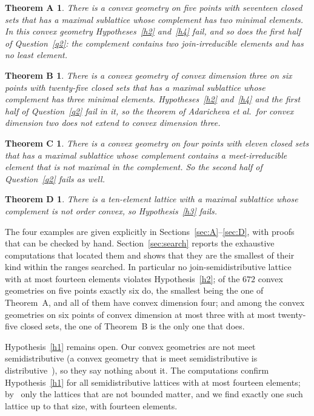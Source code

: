 \documentclass[11pt]{amsart}
\newtheorem*{theoremA}{Theorem A}
\newtheorem*{theoremB}{Theorem B}
\newtheorem*{theoremC}{Theorem C}
\newtheorem*{theoremD}{Theorem D}
\theoremstyle{definition}
\theoremstyle{remark}
\numberwithin{equation}{section}
\begin{document}
\begin{theoremA}
There is a convex geometry on five points with seventeen closed sets that has a maximal sublattice whose complement has two minimal elements. In this convex geometry Hypotheses~\ref{h2} and~\ref{h4} fail, and so does the first half of Question~\ref{q2}: the complement contains two join-irreducible elements and has no least element.
\end{theoremA}

\begin{theoremB}
There is a convex geometry of convex dimension three on six points with twenty-five closed sets that has a maximal sublattice whose complement has three minimal elements. Hypotheses~\ref{h2} and~\ref{h4} and the first half of Question~\ref{q2} fail in it, so the theorem of Adaricheva et al.\ for convex dimension two does not extend to convex dimension three.
\end{theoremB}

\begin{theoremC}
There is a convex geometry on four points with eleven closed sets that has a maximal sublattice whose complement contains a meet-irreducible element that is not maximal in the complement. So the second half of Question~\ref{q2} fails as well.
\end{theoremC}

\begin{theoremD}
There is a ten-element lattice with a maximal sublattice whose complement is not order convex, so Hypothesis~\ref{h3} fails.
\end{theoremD}

The four examples are given explicitly in Sections~\ref{sec:A}--\ref{sec:D}, with proofs that can be checked by hand. Section~\ref{sec:search} reports the exhaustive computations that located them and shows that they are the smallest of their kind within the ranges searched. In particular no join-semidistributive lattice with at most fourteen elements violates Hypothesis~\ref{h2}; of the $672$ convex geometries on five points exactly six do, the smallest being the one of Theorem~A, and all of them have convex dimension four; and among the convex geometries on six points of convex dimension at most three with at most twenty-five closed sets, the one of Theorem~B is the only one that does.

Hypothesis~\ref{h1} remains open. Our convex geometries are not meet semidistributive (a convex geometry that is meet semidistributive is distributive~\cite{AMSZ}), so they say nothing about it. The computations confirm Hypothesis~\ref{h1} for all semidistributive lattices with at most fourteen elements; by~\cite[Theorem~7]{AFNS} only the lattices that are not bounded matter, and we find exactly one such lattice up to that size, with fourteen elements.
\end{document}
